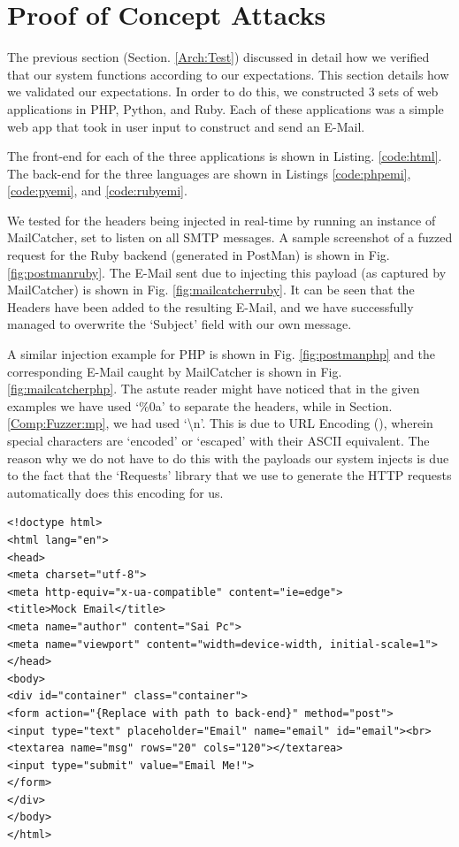 \section{Proof of Concept Attacks}
The previous section (Section. \ref{Arch:Test}) discussed in detail how we verified that our system functions according to our expectations. This section details how we validated our expectations. In order to do this, we constructed 3 sets of web applications in PHP, Python, and Ruby. Each of these applications was a simple web app that took in user input to construct and send an E-Mail.

The front-end for each of the three applications is shown in Listing. \ref{code:html}. The back-end for the three languages are shown in Listings \ref{code:phpemi}, \ref{code:pyemi}, and \ref{code:rubyemi}.

We tested for the headers being injected in real-time by running an instance of MailCatcher, set to listen on all SMTP messages. A sample screenshot of a fuzzed request for the Ruby backend (generated in PostMan) is shown in Fig. \ref{fig:postmanruby}. The E-Mail sent due to injecting this payload (as captured by MailCatcher) is shown in Fig. \ref{fig:mailcatcherruby}. It can be seen that the Headers have been added to the resulting E-Mail, and we have successfully managed to overwrite the `Subject' field with our own message.

A similar injection example for PHP is shown in Fig. \ref{fig:postmanphp} and the corresponding E-Mail caught by MailCatcher is shown in Fig. \ref{fig:mailcatcherphp}. The astute reader might have noticed that in the given examples we have used `\%0a' to separate the headers, while in Section. \ref{Comp:Fuzzer:mp}, we had used `\textbackslash{}n'. This is due to URL Encoding (\cite{rfc1738}), wherein special characters are `encoded' or `escaped' with their ASCII equivalent.
The reason why we do not have to do this with the payloads our system injects is due to the fact that the `Requests' library that we use to generate the HTTP requests automatically does this encoding for us.\\

\begin{lstlisting}
<!doctype html>
<html lang="en">
<head>
<meta charset="utf-8">
<meta http-equiv="x-ua-compatible" content="ie=edge">
<title>Mock Email</title>
<meta name="author" content="Sai Pc">
<meta name="viewport" content="width=device-width, initial-scale=1">
</head>
<body>
<div id="container" class="container">
<form action="{Replace with path to back-end}" method="post">
<input type="text" placeholder="Email" name="email" id="email"><br>
<textarea name="msg" rows="20" cols="120"></textarea>
<input type="submit" value="Email Me!">
</form>
</div>
</body>
</html>

\end{lstlisting}

